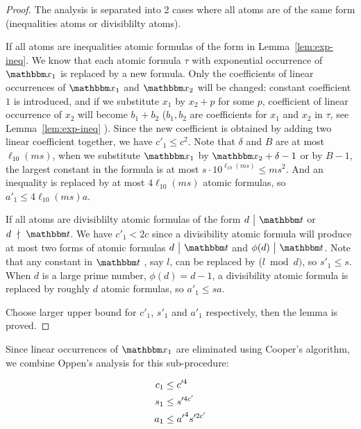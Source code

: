\begin{proof}
   
The analysis is separated into 2 cases where all atoms are of the same form (inequalities atoms or divisiblilty atoms). 

If all atoms are inequalities atomic formulas of the form in Lemma~\ref{lem:exp-ineq}. We know that each atomic formula $\tau$ with exponential occurrence of $\ivarx_1$ is replaced by a new formula. Only the coefficients of linear occurrences of $\ivarx_1$ and $\ivarx_2$ will be changed: constant coefficient $1$ is introduced, and if we substitute $x_1$ by $x_2+p$ for some $p$, coefficient of linear occurrence of $x_2$ will become $b_1+b_2$ ($b_1,b_2$ are coefficients for $x_1$ and $x_2$ in $\tau$, see Lemma~\ref{lem:exp-ineq} ). Since the new coefficient is obtained by adding two linear coefficient together, we have $c'_1\le c^2$. Note that $\delta$ and $B$ are at most $\ell_{10}(ms)$, when we substitute $\ivarx_1$ by $\ivarx_2+\delta-1$ or by $B-1$, the largest constant in the formula is at most $s\cdot  10^{\ell_{10}(ms)}\le ms^2$. And an inequality is replaced by at most $4\ell_{10}(ms)$ atomic formulas, so $a'_1\le 4\ell_{10}(ms)a$.

If all atoms are divisiblilty atomic formulas of the form $d \ \big | \ \iterm$ or $d \ \nmid \ \iterm$. We have $c'_1<2c$ since a divisibility atomic formula  will produce at most two forms of atomic formulas $d \ \big | \ \iterm$ and $\phi(d) \ \big | \ \iterm$. Note that any constant in $\iterm$ , say $l$, can be replaced by ($l \bmod d)$, so $s'_1\le s$. When $d$ is a large prime number, $\phi(d)=d-1$, a divisibility atomic formula is replaced by roughly $d$ atomic formulas, so $a'_1\le sa$. 

Choose larger upper bound for $c'_1$, $s'_1$ and $a'_1$ respectively, then the lemma is proved.

\end{proof}

Since linear occurrences of $\ivarx_1$ are eliminated using Cooper's algorithm, we combine Oppen's analysis for this sub-procedure:

\begin{lemma}\label{lem:cpx oppen}
    \begin{align}
        c_1&\le c'^4 \notag \\
        s_1&\le s'^{4c'} \notag\\
        a_1&\le {a'}^4 s'^{2c'}\notag 
    \end{align} 
\end{lemma}


